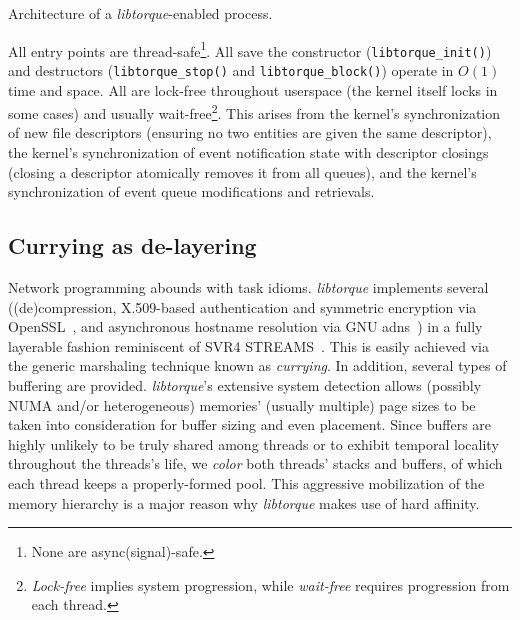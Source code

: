 \documentclass[letterpaper,10pt]{article}
\makeatletter
\newcommand{\mycaption}[1]{\caption{\small{#1}}}
\newenvironment{figurehere}
{\def\@captype{figure}}
{}
\makeatother
\begin{document}
\begin{multicols}{2}
\begin{figurehere}
\mycaption{Architecture of a \textit{libtorque}-enabled process.}
\label{fig:processArch}
\end{figurehere}
All entry points are thread-safe\footnote{None are async(signal)-safe.}. All save the constructor (\texttt{libtorque\_init()})
and destructors (\texttt{libtorque\_stop()} and \texttt{libtorque\_block()})
operate in $O(1)$ time and space. All are lock-free throughout userspace (the kernel
itself locks in some cases) and usually wait-free\footnote{\textit{Lock-free} implies system progression, while
\textit{wait-free} requires progression from each thread.}. This arises
from the kernel's synchronization of new file descriptors (ensuring no
two entities are given the same descriptor), the kernel's synchronization of
event notification state with descriptor closings (closing a descriptor
atomically removes it from all queues), and the kernel's synchronization of
event queue modifications and retrievals.
\subsection{Currying as de-layering}
Network programming abounds with task idioms. \textit{libtorque} implements
several ((de)compression, X.509-based authentication and symmetric encryption via
OpenSSL~\cite{OpenSSL}, and asynchronous hostname resolution via GNU adns~\cite{Adns})
in a fully layerable fashion reminiscent of SVR4 STREAMS~\cite{Ritchie84}. This
is easily achieved via the generic marshaling technique known as \textit{currying}.
In addition, several types of buffering are provided. \textit{libtorque}'s extensive
system detection allows (possibly NUMA and/or heterogeneous) memories' (usually
multiple) page sizes to be taken into consideration for buffer sizing and
even placement. Since buffers are highly unlikely to be truly shared among
threads or to exhibit temporal locality throughout the threads's life, we
\textit{color} both threads' stacks and buffers, of which each thread keeps a
properly-formed pool. This aggressive mobilization of the memory hierarchy is
a major reason why \textit{libtorque} makes use of hard affinity.

\end{multicols}
\end{document}

